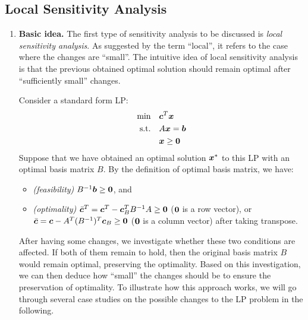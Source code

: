 \subsection{Local Sensitivity Analysis}
\label{subsect:local-sens-analysis}
\begin{enumerate}
\item \textbf{Basic idea.} The first type of sensitivity analysis to be
discussed is \emph{local sensitivity analysis}. As suggested by the term
``local'', it refers to the case where the changes are ``small''. The intuitive
idea of local sensitivity analysis is that the previous obtained optimal
solution should remain optimal after ``sufficiently small'' changes.

Consider a standard form LP:
\begin{align*}
\text{min}\quad&\bm{c}^{T}\bm{x} \\
\text{s.t.}\quad&A\bm{x}=\bm{b} \\
&\bm{x}\ge \bm{0}
\end{align*}
Suppose that we have obtained an optimal solution \(\bm{x}^*\) to this LP
with an optimal basis matrix \(B\). By the definition
of optimal basis matrix, we have:
\begin{itemize}
\item \emph{(feasibility)} \(B^{-1}\bm{b}\ge\bm{0}\), and \item
\emph{(optimality)}
\(\bar{\bm{c}}^{T}=\bm{c}^{T}-\bm{c}_{B}^{T}B^{-1}A\ge\bm{0}\)
(\(\bm{0}\) is a row vector), or
\(\bar{\bm{c}}=\bm{c}-A^{T}(B^{-1})^{T}\bm{c}_{B}\ge\bm{0}\)
(\(\bm{0}\) is a column vector) after taking transpose.
\end{itemize}
After having some changes, we investigate whether these two conditions are
affected. If both of them remain to hold, then the original basis matrix \(B\)
would remain optimal, preserving the optimality.  Based on this investigation,
we can then deduce how ``small'' the changes should be to ensure the
preservation of optimality. To illustrate how this approach works, we will go
through several case studies on the possible changes to the LP problem in the
following.


\end{enumerate}
